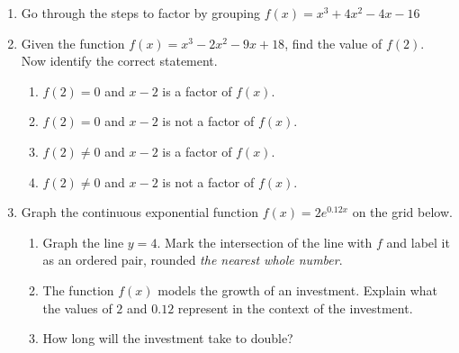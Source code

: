 \documentclass[12pt, twoside]{article}
\begin{document}
\begin{enumerate}[itemsep=0.5cm]
\newpage
\item Go through the steps to factor by grouping $f(x) = x^3+4x^2-4x-16$ \vspace{10cm}

\item Given the function $f(x) = x^3-2x^2-9x+18$, find the value of $f(2)$.\\[5cm]
Now identify the correct statement.
\begin{enumerate}
    \item $f(2)=0$ and $x-2$ is a factor of $f(x)$.
    \item $f(2)=0$ and $x-2$ is not a factor of $f(x)$.
    \item $f(2) \ne 0$ and $x-2$ is a factor of $f(x)$.
    \item $f(2) \ne 0$ and $x-2$ is not a factor of $f(x)$.
\end{enumerate}

\newpage
\item Graph the continuous exponential function $f(x) = 2e^{0.12x}$ on the grid below. 
\begin{center}
    \end{center}
    \begin{enumerate}
        \item Graph the line $y=4$. Mark the intersection of the line with $f$ and label it as an ordered pair, rounded \emph{the nearest whole number}.
        \item The function $f(x)$ models the growth of an investment. Explain what the values of $2$ and $0.12$ represent in the context of the investment. \vspace{4cm}
        \item How long will the investment take to double? 
    \end{enumerate}

\end{enumerate}
\end{document}
